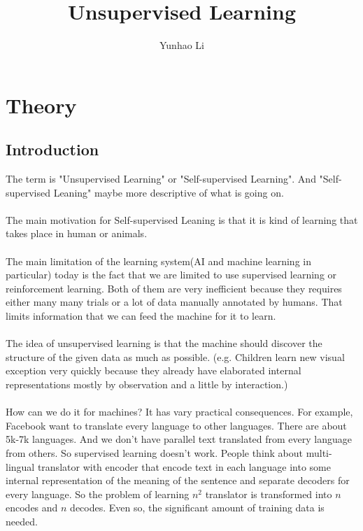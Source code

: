 \documentclass{article}
\title{Unsupervised Learning}
\author{Yunhao Li}
\begin{document}
\maketitle

\section{Theory}

\subsection{Introduction}

The term is "Unsupervised Learning" or "Self-supervised Learning". And "Self-supervised Leaning" maybe more descriptive of what is going on. \\ \\

The main motivation for Self-supervised Leaning is that it is kind of learning that takes place in human or animals. \\ \\

The main limitation of the learning system(AI and machine learning in particular) today is the fact that we are limited to use supervised learning or reinforcement learning. Both of them are very inefficient because they requires either many many trials or a lot of data manually annotated by humans. That limits information that we can feed the machine for it to learn. \\ \\

The idea of unsupervised learning is that the machine should discover the structure of the given data as much as possible. (e.g. Children learn new visual exception very quickly because they already have elaborated internal representations mostly by observation and a little by interaction.) \\ \\

How can we do it for machines? It has vary practical consequences. For example, Facebook want to translate every language to other languages. There are about 5k-7k languages. And we don't have parallel text translated from every language from others. So supervised learning doesn't work. People think about multi-lingual translator with encoder that encode text in each language into some internal representation of the meaning of the sentence and separate decoders for every language. So the problem of learning $n^2$ translator is transformed into $n$ encodes and $n$ decodes. Even so, the significant amount of training data is needed. \\ \\    
\end{document}
